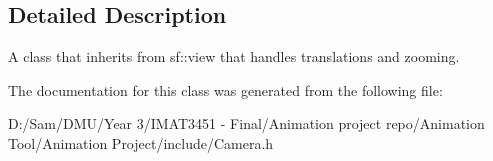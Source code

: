 \subsection{Detailed Description}
A class that inherits from sf\+::view that handles translations and zooming. 

The documentation for this class was generated from the following file\+:\begin{DoxyCompactItemize}
\item 
D\+:/\+Sam/\+D\+M\+U/\+Year 3/\+I\+M\+A\+T3451 -\/ Final/\+Animation project repo/\+Animation Tool/\+Animation Project/include/Camera.\+h\end{DoxyCompactItemize}
